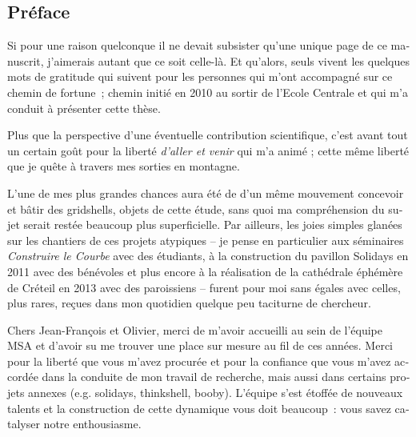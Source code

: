 
\begin{otherlanguage}{french}
\chapter*{Préface}


Si pour une raison quelconque il ne devait subsister qu'une unique page de ce manuscrit, j'aimerais autant que ce soit celle-là. Et qu'alors, seuls vivent les quelques mots de gratitude qui suivent pour les personnes qui m'ont accompagné sur ce chemin de fortune~; chemin initié en 2010 au sortir de l'Ecole Centrale et qui m'a conduit à présenter cette thèse.

Plus que la perspective d'une éventuelle contribution scientifique, c'est avant tout un certain goût pour la liberté \emph{d'aller et venir} qui m'a animé ; cette même liberté que je quête à travers mes sorties en montagne.

L'une de mes plus grandes chances aura été de d'un même mouvement concevoir et bâtir des gridshells, objets de cette étude, sans quoi ma compréhension du sujet serait restée beaucoup plus superficielle. Par ailleurs, les joies simples glanées sur les chantiers de ces projets atypiques -- je pense en particulier aux séminaires \emph{Construire le Courbe} avec des étudiants, à la construction du pavillon Solidays en 2011 avec des bénévoles et plus encore à la réalisation de la cathédrale éphémère de Créteil en 2013 avec des paroissiens -- furent pour moi sans égales avec celles, plus rares, reçues dans mon quotidien quelque peu taciturne de chercheur.

Chers Jean-François et Olivier, merci de m'avoir accueilli au sein de l'équipe MSA et d'avoir su me trouver une place sur mesure au fil de ces années. Merci pour la liberté que vous m'avez procurée et pour la confiance que vous m'avez accordée dans la conduite de mon travail de recherche, mais aussi dans certains projets annexes (e.g. solidays, thinkshell, booby). L'équipe s'est étoffée de nouveaux talents et la construction de cette dynamique vous doit beaucoup~: vous savez catalyser notre enthousiasme.


\end{otherlanguage}
